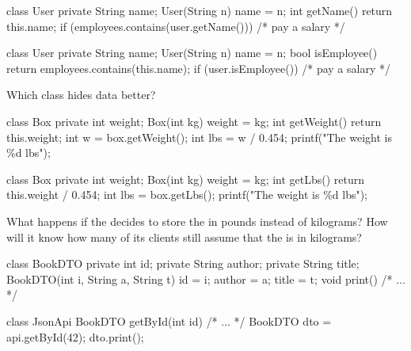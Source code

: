 \documentclass{article}
\begin{document}
\begin{pptWide}{2}
{\small\begin{ffcode}
class User {
  private String name;
  User(String n) { name = n; }
  int getName() {
    return this.name;
  }
}
if (employees.contains(user.getName())) {
  /* pay a salary */
}
\end{ffcode}
}
\par\columnbreak\par
{\small\begin{ffcode}
class User {
  private String name;
  User(String n) { name = n; }
  bool isEmployee() {
    return employees.contains(this.name);
  }
}
if (user.isEmployee()) {
  /* pay a salary */
}
\end{ffcode}
}
\end{pptWide}
\par
Which class hides data better?
\plush{}

\begin{pptWide}{2}
{\small\begin{ffcode}
class Box {
  private int weight;
  Box(int kg) { weight = kg; }
  int getWeight() {
    return this.weight;
  }
}
int w = box.getWeight();
int lbs = w / 0.454;
printf("The weight is \%d lbs\n");
\end{ffcode}
}
\par\columnbreak\par
{\small\begin{ffcode}
class Box {
  private int weight;
  Box(int kg) { weight = kg; }
  int getLbs() {
    return this.weight / 0.454;
  }
}
int lbs = box.getLbs();
printf("The weight is \%d lbs\n");
\end{ffcode}
}
\end{pptWide}
\par
What happens if the  decides to store the  in pounds instead of kilograms? How will it know how many of its clients still assume that the  is in kilograms?
\plush{}


\begin{pptWide}{2}
{\small\begin{ffcode}
class BookDTO {
  private int id;
  private String author;
  private String title;
  BookDTO(int i, String a, String t)
    { id = i; author = a; title = t; }
  void print() { /* ... */ }
}
\end{ffcode}
}
\par\columnbreak\par
{\small\begin{ffcode}
class JsonApi {
  BookDTO getById(int id) { /* ... */ }
}
BookDTO dto = api.getById(42);
dto.print();
\end{ffcode}
}
\end{pptWide}
\par
\plush{}
\end{document}
